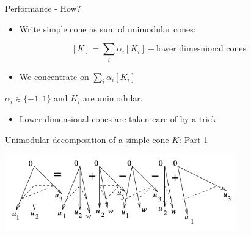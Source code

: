\documentclass[8pt]{beamer}
\begin{document}
\begin{frame}[label=sec-12]{Performance - How?}
\begin{itemize}
\item Write simple cone as sum of unimodular cones:
\end{itemize}
$$[K] = \sum_i \alpha_i [K_i]+ \text{lower dimesnional cones}$$ 

\begin{itemize}
\item We concentrate on $\sum_i \alpha_i [K_i]$
\end{itemize}
\begin{center}
    $\alpha_i \in \{ -1, 1 \}$  and $K_i$ are unimodular.
\end{center}

\begin{itemize}
\item Lower dimensional cones are taken care of by a trick.
\end{itemize}
\end{frame}



\begin{frame}[label=sec-13]{Unimodular decomposition of a simple cone $K$: Part 1}
\begin{center}
\includegraphics[width=10cm, keepaspectratio]{res/simple-cone-into-unimodular-cones}
\end{center}
\end{frame}
\end{document}
